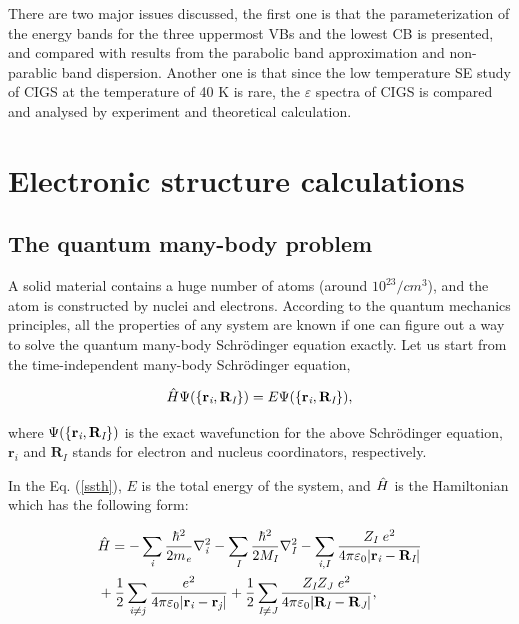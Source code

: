 \documentclass[a4paper, 12pt, titlepage,oneside,drop]{kthesis}
\begin{document}
There are two major issues discussed, the first one is that the parameterization of the energy bands for the three uppermost VBs and the lowest CB is presented, and compared with results from the parabolic band approximation and non-parablic band
dispersion. Another one is that since the low temperature SE study of CIGS at the temperature of 40 K is rare, the ${\varepsilon}$ spectra of CIGS is compared and analysed by experiment and theoretical
calculation. 


\chapter{Electronic structure calculations }
\label{ch:dft}

\section{The quantum many-body problem}
\label{ch:mb}

\noindent A solid material contains a huge number of atoms (around $10^{23}/cm^3$), and the atom is constructed by nuclei and electrons. 
According to the quantum mechanics principles, all the properties of any system are known if one can figure out a way to solve 
the quantum many-body Schrödinger equation exactly. Let us start from the time-independent many-body Schrödinger equation,

 
\begin{equation}\label{ssth}
 {\hat{H}} {\Psi(\{ {\textbf r}_{\textit i}, {\textbf R}_{\textit I} \})} = {E} {\Psi(\{ {\textbf r}_{\textit i}, {\textbf R}_{\textit I} \})},
\end{equation}

\noindent where $\Psi(\{ {\textbf r}_{\textit i}, {\textbf R}_{\textit I} \})$  is the exact wavefunction for the above Schrödinger equation, $\textbf{r}_\textit{i}$ and $\textbf{R}_\textit{I}$  stands for electron and
nucleus coordinators, respectively.

In the Eq. (\ref{ssth}), $E$ is the total energy of the system, and $\hat{H}$ is the Hamiltonian which has the following form:

\begin{equation}\label{th}
\begin{split}
& \hath = - \sumi<i> {\frac{\hbar^{2}}{2 m_{\textit e}}}   \nablaia<i> - \sumi<I> {\frac{\hbar^{2}}{2 M_\textit{I}}} \nablaia<I>  - \sumij<i><I> \frac{Z_\textit{I}\ e^2}{4 \pi \varepsilon_0 |\textbf{r}_\textit{i}-\textbf{R}_\textit{I}|} \\
& + \frac{1}{2} \suminj<i><j> \frac{ e^2}{4 \pi \varepsilon_0 |\textbf{r}_\textit{i}-\textbf{r}_\textit{j}|} + \frac{1}{2} \suminj<I><J> \frac{Z_\textit{I} Z_\textit{J}\  e^2}{4 \pi \varepsilon_0 |\textbf{R}_\textit{I}-\textbf{R}_\textit{J}|},
\end{split}
\end{equation}
\end{document}
